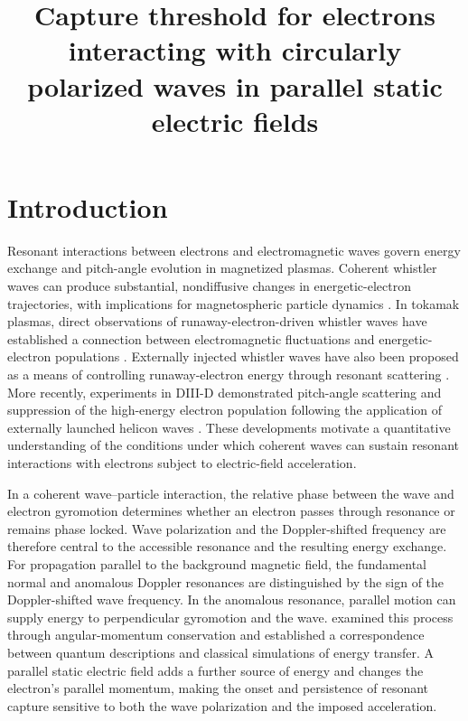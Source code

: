 \documentclass[11pt,a4paper]{article}
\title{Capture threshold for electrons interacting with circularly polarized waves in parallel static electric fields}
\author{}
\date{}
\begin{document}
\maketitle

\section{Introduction}

Resonant interactions between electrons and electromagnetic waves govern energy exchange and pitch-angle evolution in magnetized plasmas. Coherent whistler waves can produce substantial, nondiffusive changes in energetic-electron trajectories, with implications for magnetospheric particle dynamics \citep{YoonBellan2020}. In tokamak plasmas, direct observations of runaway-electron-driven whistler waves have established a connection between electromagnetic fluctuations and energetic-electron populations \citep{Spong2018}. Externally injected whistler waves have also been proposed as a means of controlling runaway-electron energy through resonant scattering \citep{Guo2018}. More recently, experiments in DIII-D demonstrated pitch-angle scattering and suppression of the high-energy electron population following the application of externally launched helicon waves \citep{Choudhury2026}. These developments motivate a quantitative understanding of the conditions under which coherent waves can sustain resonant interactions with electrons subject to electric-field acceleration.

In a coherent wave--particle interaction, the relative phase between the wave and electron gyromotion determines whether an electron passes through resonance or remains phase locked. Wave polarization and the Doppler-shifted frequency are therefore central to the accessible resonance and the resulting energy exchange. For propagation parallel to the background magnetic field, the fundamental normal and anomalous Doppler resonances are distinguished by the sign of the Doppler-shifted wave frequency. In the anomalous resonance, parallel motion can supply energy to perpendicular gyromotion and the wave. \citet{Xu2025} examined this process through angular-momentum conservation and established a correspondence between quantum descriptions and classical simulations of energy transfer. A parallel static electric field adds a further source of energy and changes the electron's parallel momentum, making the onset and persistence of resonant capture sensitive to both the wave polarization and the imposed acceleration.
\end{document}
